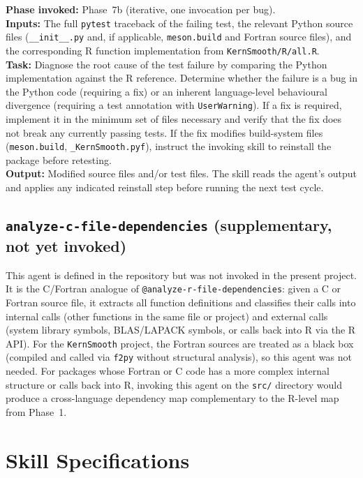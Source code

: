 \documentclass[12pt,a4paper]{article}
\makeatletter
\newcommand{\agent}[1]{\texttt{@#1}}
\newcommand{\pkg}[1]{\texttt{#1}}
\makeatother
\begin{document}
\textbf{Phase invoked:} Phase~7b (iterative, one invocation per bug).\\
\textbf{Inputs:} The full \texttt{pytest} traceback of the failing test, the relevant Python source files (\texttt{\_\_init\_\_.py} and, if applicable, \texttt{meson.build} and Fortran source files), and the corresponding R function implementation from \texttt{KernSmooth/R/all.R}.\\
\textbf{Task:} Diagnose the root cause of the test failure by comparing the Python implementation against the R reference. Determine whether the failure is a bug in the Python code (requiring a fix) or an inherent language-level behavioural divergence (requiring a test annotation with \texttt{UserWarning}). If a fix is required, implement it in the minimum set of files necessary and verify that the fix does not break any currently passing tests. If the fix modifies build-system files (\texttt{meson.build}, \texttt{\_KernSmooth.pyf}), instruct the invoking skill to reinstall the package before retesting.\\
\textbf{Output:} Modified source files and/or test files. The skill reads the agent's output and applies any indicated reinstall step before running the next test cycle.

\subsection{\texttt{analyze-c-file-dependencies} (supplementary, not yet invoked)}
\label{supp:agent-analyze-c}

This agent is defined in the repository but was not invoked in the present project. It is the C/Fortran analogue of \agent{analyze-r-file-dependencies}: given a C or Fortran source file, it extracts all function definitions and classifies their calls into internal calls (other functions in the same file or project) and external calls (system library symbols, BLAS/LAPACK symbols, or calls back into R via the R API). For the \pkg{KernSmooth} project, the Fortran sources are treated as a black box (compiled and called via \pkg{f2py} without structural analysis), so this agent was not needed. For packages whose Fortran or C code has a more complex internal structure or calls back into R, invoking this agent on the \texttt{src/} directory would produce a cross-language dependency map complementary to the R-level map from Phase~1.

\section{Skill Specifications}
\label{supp:skills}
\end{document}
